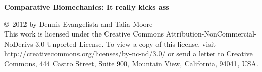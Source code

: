 

\clearpage
\thispagestyle{empty}

\vspace*{3in}
\flushleft \textbf{\Huge Comparative Biomechanics: It really kicks ass}

\vspace{2in}

{\footnotesize\copyright\ 2012 by Dennis Evangelista and Talia Moore\\
\medskip
This work is licensed under the Creative Commons Attribution-NonCommercial-NoDerivs 3.0 Unported License. To view a copy of this license, visit http://creativecommons.org/licenses/by-nc-nd/3.0/ or send a letter to Creative Commons, 444 Castro Street, Suite 900, Mountain View, California, 94041, USA.}


